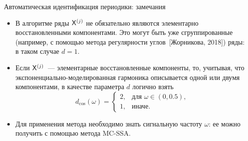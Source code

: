 \documentclass[pdf,notheorems,10pt,intlimits,unicode]{beamer}
\newtheorem{algorithm}{Алгоритм}
\begin{document}
\begin{frame}{Автоматическая идентификация периодики: замечания}

    \begin{itemize}
        \item   В алгоритме ряды $\mathsf{X}^{(j)}$ не обязательно являются элементарно восстановленными компонентами. Это могут быть уже сгруппированные (например, с помощью метода регулярности углов~[Жорникова, 2018]) ряды: в таком случае $d=1$.
        \item  Если $\mathsf{X}^{(j)}$~--- элементарные восстановленные компоненты, то, учитывая, что экспоненциально-моделированная гармоника описывается одной или двумя компонентами, в качестве параметра $d$ логично взять
              \begin{equation}\label{eq:d_cos}
                  d_{\cos}(\omega)=
                  \begin{cases}
                      2, & \text{для } \omega\in(0, 0.5), \\
                      1, & \text{иначе}.
                  \end{cases}
              \end{equation}
        \item Для применения метода необходимо знать сигнальную частоту $\omega$: ее можно получить с помощью метода MC-SSA.
    \end{itemize}

\end{frame}




\end{document}
